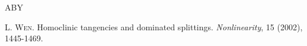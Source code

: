 \documentclass[11pt, a4paper]{amsart}
\theoremstyle{plain}
\theoremstyle{definition}
\theoremstyle{remark}
\numberwithin{equation}{section}         %
\begin{document}
\begin{thebibliography}{ABY}

\textsc{L. Wen.}
Homoclinic tangencies and dominated splittings.
\textit{Nonlinearity}, 15 (2002), 1445-1469.



\end{thebibliography}
\end{document}
